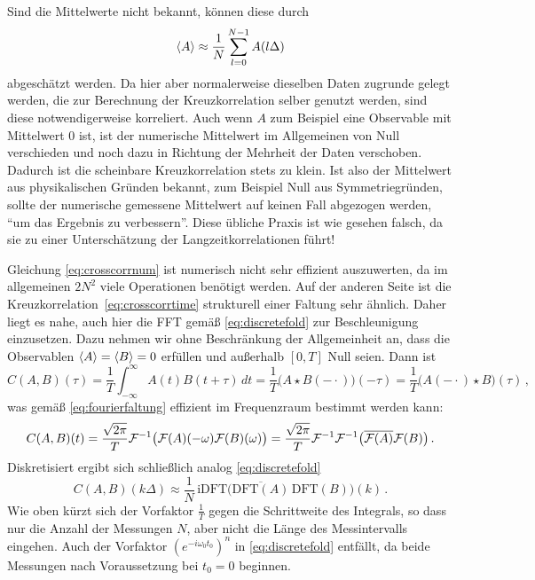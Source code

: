 Sind die Mittelwerte nicht bekannt, können diese durch
\begin{equation}
  \left\langle{A}\right\rangle\approx
  \frac{1}{N}\sum_{l=0}^{N-1}A(l\Delta)
\end{equation}
abgeschätzt werden. Da hier aber normalerweise dieselben Daten zugrunde gelegt
werden, die zur Berechnung der Kreuzkorrelation selber genutzt
werden, sind diese notwendigerweise korreliert. Auch wenn $A$ zum Beispiel eine
Observable mit Mittelwert 0 ist, ist der numerische Mittelwert im Allgemeinen
von Null verschieden und noch dazu in Richtung der Mehrheit der Daten
verschoben. Dadurch ist die scheinbare Kreuzkorrelation stets zu klein. Ist also
der Mittelwert aus physikalischen Gründen bekannt, zum Beispiel Null aus Symmetriegründen, sollte der numerische gemessene
Mittelwert auf keinen Fall abgezogen werden, "`um das Ergebnis zu verbessern"'. Diese übliche Praxis ist wie gesehen falsch, da sie zu einer
Unterschätzung der Langzeitkorrelationen führt!

Gleichung \eqref{eq:crosscorrnum} ist numerisch nicht sehr
effizient auszuwerten, da im allgemeinen $2N^2$ viele Operationen
benötigt werden. Auf der anderen Seite ist die
Kreuzkorrelation~\eqref{eq:crosscorrtime} strukturell einer Faltung
sehr ähnlich.  Daher liegt es nahe, auch hier die FFT gemäß
\eqref{eq:discretefold} zur Beschleunigung einzusetzen. Dazu nehmen wir ohne Beschränkung der Allgemeinheit an, dass die Observablen $\left\langle{A}\right\rangle=\left\langle{B}\right\rangle=0$ erfüllen und  außerhalb $[0,T]$ Null seien. Dann ist
\begin{equation}
  C(A,B)(\tau) =
  \frac{1}{T}\int_{-\infty}^{\infty} A(t)B(t+\tau)\,dt
  =  
  \frac{1}{T}\bigl(A \star B(-\cdot)\bigr)(-\tau) =
  \frac{1}{T} \bigl(A(-\cdot) \star B\bigr)(\tau)\,,
\end{equation}
was gemäß \eqref{eq:fourierfaltung} effizient im Frequenzraum bestimmt werden kann:
\begin{equation}
  \label{eq:crosscorrfft}
  C(A,B)(t) = \frac{\sqrt{2\pi}}{T}\mathcal F^{-1}
  \bigl(\mathcal F(A)(-\omega)\mathcal F(B)(\omega)\bigr) = \frac{\sqrt{2\pi}}{T}\mathcal F^{-1}\mathcal F^{-1}
  \bigl(\overline{\mathcal F(A)}\mathcal F(B)\bigr)\,.
\end{equation}
Diskretisiert ergibt sich schließlich analog \eqref{eq:discretefold}
\begin{equation}
  \label{eq:crosscorrnumfft}
  C(A,B)(k\Delta)
  \approx
  \frac{1}{N}\,\text{iDFT}
  \bigl(\overline{\text{DFT}(A)}\,\text{DFT}(B)\bigr)(k)\,.
\end{equation}
Wie oben kürzt sich der Vorfaktor $\frac{1}{T}$ gegen die Schrittweite
des Integrals, so dass nur die Anzahl der Messungen $N$, aber nicht
die Länge des Messintervalls eingehen. Auch der Vorfaktor
$\left(e^{-i\omega_0 t_0}\right)^n$ in \eqref{eq:discretefold}
entfällt, da beide Messungen nach Voraussetzung bei $t_0=0$ beginnen.

